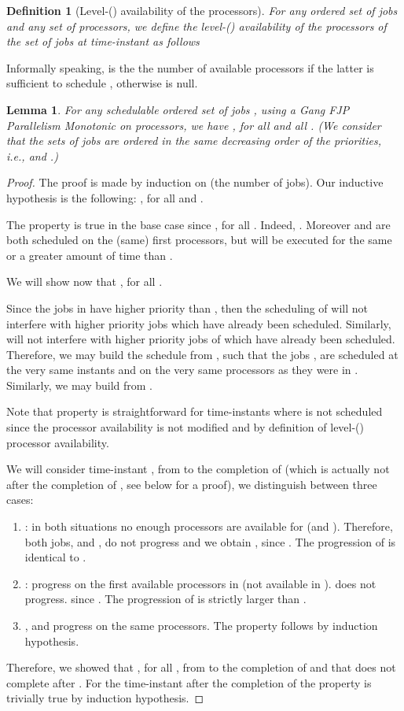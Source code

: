 \documentclass[a4paper]{article}
\newtheorem{definition}[theorem]{Definition}
\newtheorem{lemma}[theorem]{Lemma}
\begin{document}
\begin{definition}[Level-() availability of the processors]
For any ordered set of  jobs  and any set of  processors, we define the \emph{level-() availability of the processors}  of the set of jobs  at time-instant  as follows 

\end{definition}

Informally speaking,  is the the number of available processors if the latter is sufficient to schedule , otherwise  is null.  

\begin{lemma}\label{lem:AParMon} 
For any schedulable ordered set of jobs , using a Gang FJP Parallelism Monotonic on   processors, we have , for all  and all . (We consider that the sets of jobs are ordered in the same decreasing order of the priorities, i.e.,  and .)
\end{lemma}
\begin{proof}
  The proof is made by induction on  (the number of jobs).  Our inductive hypothesis is the following: , for all  and .
 
  The property is true in the base case since , for all . Indeed, . Moreover  and  are both scheduled on the (same) first  processors, but  will be executed for the same or a greater amount of time than .

  We will show now that , for all .

  Since the jobs in  have higher priority than , then the scheduling of  will not interfere with higher priority jobs which have already been scheduled. Similarly,  will not interfere with higher priority jobs of  which have already been scheduled. Therefore, we may build the schedule  from , such that the jobs , are scheduled at the very same instants and on the very same processors as they were in . Similarly, we may build  from .

Note that property is straightforward for time-instants where  is not scheduled since the processor availability is not modified and by definition of level-() processor availability. 

We will consider time-instant , from  to the completion of  (which is actually not after the completion of , see below for a proof), we distinguish between three cases:
\begin{enumerate}

\item : in both situations no enough processors are available for  (and ). Therefore, both jobs,  and , do not progress and we obtain , since . The progression of  is identical to . 
\item \label{item:add} :  progress on the  first available processors in  (not available in ).  does not progress.  since . The progression of  is strictly larger than .
\item \label{item:idem} ,  and  progress on the same processors. The property follows by induction hypothesis. 
\end{enumerate}
Therefore, we showed that , for all , from  to the completion of  and that  does not complete after . For the time-instant after the completion of  the property is trivially true by induction hypothesis.
\end{proof}
\end{document}
